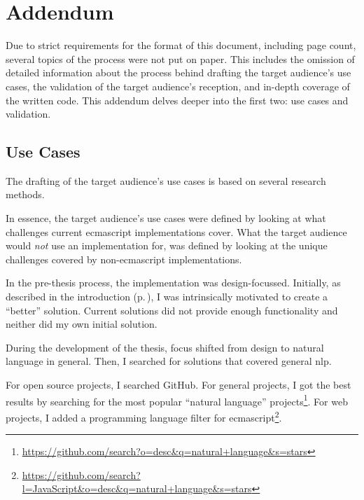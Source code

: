 
\begingroup
\let\clearpage\relax
\let\cleardoublepage\relax
\let\cleardoublepage\relax

\manualmark
{}

\chapter*{Addendum}\label{addendum}

Due to strict requirements for the format of this document, including page
  count, several topics of the process were not put on paper.
This includes the omission of detailed information about the process behind
  drafting the target audience's use cases, the validation of the
  target audience's reception, and in-depth coverage of the written code.
This addendum delves deeper into the first two: use cases and validation.

\section*{Use Cases}\label{addendum-use-cases}

The drafting of the target audience's use cases is based on several research
  methods.

In essence, the target audience's use cases were defined by looking at what
  challenges current \gls{ecmascript} implementations cover.
What the target audience would \emph{not} use an implementation for, was
  defined by looking at the unique challenges covered by non-\gls{ecmascript}
  implementations.

In the pre-thesis process, the implementation was design-focussed.
Initially, as described in the introduction (p.\,\pageref{introduction}), I
  was intrinsically motivated to create a ``better'' solution.
Current solutions did not provide enough functionality and neither did my own
  initial solution.

During the development of the thesis, focus shifted from design to natural
  language in general.
Then, I searched for solutions that covered general \gls{nlp}.

For open source projects, I searched GitHub.
For general projects, I got the best results by searching for the most
  popular ``natural language'' projects\footnote{
    \url{https://github.com/search?o=desc&q=natural+language&s=stars}
  }.
For web projects, I added a programming language filter for
  \gls{ecmascript}\footnote{
    \url{https://github.com/search?l=JavaScript&o=desc&q=natural+language&s=stars}
  }.

